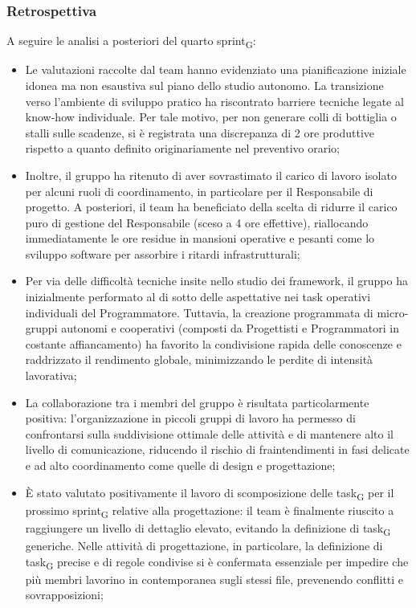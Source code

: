 ﻿\documentclass[a4paper, 10pt, colorlinks=true, linkcolor=black, urlcolor=blue, citecolor=blue, hidelinks]{article}
\begin{document}
\subsubsection{Retrospettiva}
A seguire le analisi a posteriori del quarto sprint\textsubscript{G}:
\begin{itemize}
    \item Le valutazioni raccolte dal team hanno evidenziato una pianificazione iniziale idonea ma non esaustiva sul piano dello studio autonomo. La transizione verso l'ambiente di sviluppo pratico ha riscontrato barriere tecniche legate al know-how individuale. Per tale motivo, per non generare colli di bottiglia o stalli sulle scadenze, si è registrata una discrepanza di 2 ore produttive rispetto a quanto definito originariamente nel preventivo orario;
    \item Inoltre, il gruppo ha ritenuto di aver sovrastimato il carico di lavoro isolato per alcuni ruoli di coordinamento, in particolare per il Responsabile di progetto. A posteriori, il team ha beneficiato della scelta di ridurre il carico puro di gestione del Responsabile (sceso a 4 ore effettive), riallocando immediatamente le ore residue in mansioni operative e pesanti come lo sviluppo software per assorbire i ritardi infrastrutturali;
    \item Per via delle difficoltà tecniche insite nello studio dei framework, il gruppo ha inizialmente performato al di sotto delle aspettative nei task operativi individuali del Programmatore. Tuttavia, la creazione programmata di micro-gruppi autonomi e cooperativi (composti da Progettisti e Programmatori in costante affiancamento) ha favorito la condivisione rapida delle conoscenze e raddrizzato il rendimento globale, minimizzando le perdite di intensità lavorativa;
    \item La collaborazione tra i membri del gruppo è risultata particolarmente positiva: l'organizzazione in piccoli gruppi di lavoro ha permesso di confrontarsi sulla suddivisione ottimale delle attività e di mantenere alto il livello di comunicazione, riducendo il rischio di fraintendimenti in fasi delicate e ad alto coordinamento come quelle di design e progettazione;
    \item È stato valutato positivamente il lavoro di scomposizione delle task\textsubscript{G} per il prossimo sprint\textsubscript{G} relative alla progettazione: il team è finalmente riuscito a raggiungere un livello di dettaglio elevato, evitando la definizione di task\textsubscript{G} generiche. Nelle attività di progettazione, in particolare, la definizione di task\textsubscript{G} precise e di regole condivise si è confermata essenziale per impedire che più membri lavorino in contemporanea sugli stessi file, prevenendo conflitti e sovrapposizioni;

\end{itemize}
\end{document}
